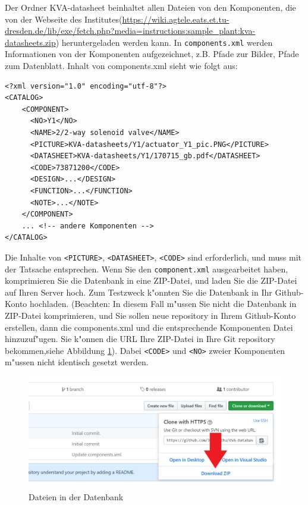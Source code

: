 \documentclass[a4paper,11pt,twoside]{article}
\begin{document}
Der Ordner KVA-datasheet beinhaltet allen Dateien von den Komponenten, die von der Webseite des Institutes(\url{https://wiki.agtele.eats.et.tu-dresden.de/lib/exe/fetch.php?media=instructions:sample_plant:kva-datasheets.zip}) heruntergeladen werden kann. In \texttt{components.xml} werden Informationen von der Komponenten aufgezeichnet, z.B. Pfade zur Bilder, Pfade zum Datenblatt. Inhalt von components.xml sieht wie folgt aus:
\newpage
\lstset{language=XML}
\begin{lstlisting}
<?xml version="1.0" encoding="utf-8"?>
<CATALOG>
	<COMPONENT>
	  <NO>Y1</NO>
	  <NAME>2/2-way solenoid valve</NAME>
	  <PICTURE>KVA-datasheets/Y1/actuator_Y1_pic.PNG</PICTURE>
	  <DATASHEET>KVA-datasheets/Y1/170715_gb.pdf</DATASHEET>
	  <CODE>73871200</CODE>
	  <DESIGN>...</DESIGN>
	  <FUNCTION>...</FUNCTION>
	  <NOTE>...</NOTE>
	</COMPONENT>
	... <!-- andere Komponenten -->
</CATALOG>	
\end{lstlisting}

Die Inhalte von \texttt{<PICTURE>}, \texttt{<DATASHEET>}, \texttt{<CODE>} sind erforderlich, und muss mit der Tatsache entsprechen. Wenn Sie den \texttt{component.xml} ausgearbeitet haben, komprimieren Sie die Datenbank in eine ZIP-Datei, und laden Sie die ZIP-Datei auf Ihren Server hoch. Zum Testzweck  k"onnten Sie die Datenbank in Ihr Github-Konto hochladen. (Beachten: In diesem Fall m"ussen Sie nicht die Datenbank in ZIP-Datei komprimieren, und Sie sollen neue repository in Ihrem Github-Konto erstellen, dann die components.xml und die entsprechende Komponenten Datei hinzuzuf"ugen. Sie k"onnen die URL Ihre ZIP-Datei in Ihre Git repository bekommen,siehe Abbildung \ref{fig:database2}). Dabei \texttt{<CODE>} und \texttt{<NO>} zweier Komponenten m"ussen nicht identisch gesetzt werden.
\begin{figure}[h]
	\centering
	\includegraphics[width=\linewidth]{pic/database2}
	\caption{Dateien in der Datenbank}\label{fig:database2}
	\endminipage
\end{figure}
\end{document}
